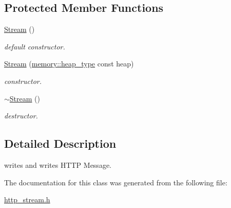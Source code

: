 \subsection*{Protected Member Functions}
\begin{DoxyCompactItemize}
\item 
\hypertarget{classhryky_1_1http_1_1_stream_aa5ad1f5164b2bbfe98eec63a9553d2eb}{\hyperlink{classhryky_1_1http_1_1_stream_aa5ad1f5164b2bbfe98eec63a9553d2eb}{Stream} ()}\label{classhryky_1_1http_1_1_stream_aa5ad1f5164b2bbfe98eec63a9553d2eb}

\begin{DoxyCompactList}\small\item\em default constructor. \end{DoxyCompactList}\item 
\hypertarget{classhryky_1_1http_1_1_stream_aa3f542a4a69fc3770f146f4462f6c7d6}{\hyperlink{classhryky_1_1http_1_1_stream_aa3f542a4a69fc3770f146f4462f6c7d6}{Stream} (\hyperlink{classhryky_1_1memory_1_1heap_1_1_base}{memory\-::heap\-\_\-type} const heap)}\label{classhryky_1_1http_1_1_stream_aa3f542a4a69fc3770f146f4462f6c7d6}

\begin{DoxyCompactList}\small\item\em constructor. \end{DoxyCompactList}\item 
\hypertarget{classhryky_1_1http_1_1_stream_adbc88d3ec0a9d0ce497f575f44ef32a8}{\hyperlink{classhryky_1_1http_1_1_stream_adbc88d3ec0a9d0ce497f575f44ef32a8}{$\sim$\-Stream} ()}\label{classhryky_1_1http_1_1_stream_adbc88d3ec0a9d0ce497f575f44ef32a8}

\begin{DoxyCompactList}\small\item\em destructor. \end{DoxyCompactList}\end{DoxyCompactItemize}


\subsection{Detailed Description}
writes and writes H\-T\-T\-P Message. 

The documentation for this class was generated from the following file\-:\begin{DoxyCompactItemize}
\item 
\hyperlink{http__stream_8h}{http\-\_\-stream.\-h}\end{DoxyCompactItemize}

